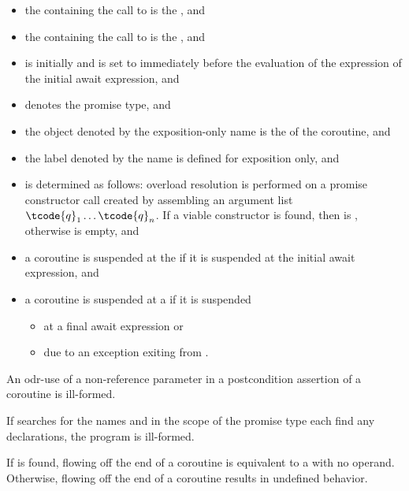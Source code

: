 \begin{itemize}
\item
{}%
the  containing
the call to 
is the , and
\item
the  containing
the call to 
is the , and
\item
{}
is initially  and is set to 
immediately before the evaluation
of the  expression
of the initial await expression, and
\item
{} denotes the promise type, and
\item
the object denoted by the exposition-only name 
is the  of the coroutine, and
\item
the label denoted by the name 
is defined for exposition only, and
\item
{} is determined as follows:
overload resolution is performed on a promise constructor call created by
assembling an argument list $\tcode{q}_1 \dotsc \tcode{q}_n$. If a viable
constructor is found, then
 is
, otherwise
 is empty, and
\item
a coroutine is suspended at the  if
it is suspended at the initial await expression, and
\item
a coroutine is suspended at a  if
it is suspended
\begin{itemize}
\item
at a final await expression or
\item
due to an exception exiting from .
\end{itemize}
\end{itemize}

\pnum
\begin{note}
An odr-use of a non-reference parameter
in a postcondition assertion
of a coroutine is ill-formed.
\end{note}

\pnum
If searches for the names  and 
in the scope of the promise type each find any declarations,
the program is ill-formed.
\begin{note}
If  is found, flowing off
the end of a coroutine is equivalent to a  with no operand.
Otherwise, flowing off the end of a coroutine
results in undefined behavior.
\end{note}

